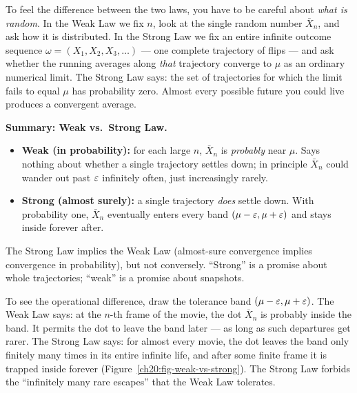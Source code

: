 To feel the difference between the two laws, you have to be careful about \emph{what is random}. In the Weak Law we fix $n$, look at the single random number $\bar X_n$, and ask how it is distributed. In the Strong Law we fix an entire infinite outcome sequence $\omega = (X_1, X_2, X_3, \dots)$ --- one complete trajectory of flips --- and ask whether the running averages along \emph{that} trajectory converge to $\mu$ as an ordinary numerical limit. The Strong Law says: the set of trajectories for which the limit fails to equal $\mu$ has probability zero. Almost every possible future you could live produces a convergent average.

\begin{focusbox}
\textbf{Summary: Weak vs.\ Strong Law.}
\begin{itemize}
  \item \textbf{Weak (in probability):} for each large $n$, $\bar X_n$ is \emph{probably} near $\mu$. Says nothing about whether a single trajectory settles down; in principle $\bar X_n$ could wander out past $\varepsilon$ infinitely often, just increasingly rarely.
  \item \textbf{Strong (almost surely):} a single trajectory \emph{does} settle down. With probability one, $\bar X_n$ eventually enters every band $(\mu-\varepsilon, \mu+\varepsilon)$ and stays inside forever after.
\end{itemize}
The Strong Law implies the Weak Law (almost-sure convergence implies convergence in probability), but not conversely. ``Strong'' is a promise about whole trajectories; ``weak'' is a promise about snapshots.
\end{focusbox}

\begin{happeningbox}
To see the operational difference, draw the tolerance band $(\mu-\varepsilon,\mu+\varepsilon)$. The Weak Law says: at the $n$-th frame of the movie, the dot $\bar X_n$ is probably inside the band. It permits the dot to leave the band later --- as long as such departures get rarer. The Strong Law says: for almost every movie, the dot leaves the band only finitely many times in its entire infinite life, and after some finite frame it is trapped inside forever (Figure~\ref{ch20:fig-weak-vs-strong}). The Strong Law forbids the ``infinitely many rare escapes'' that the Weak Law tolerates.
\end{happeningbox}


